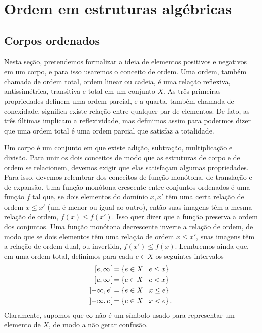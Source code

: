 \chapter{Ordem em estruturas algébricas}


\section{Corpos ordenados}

Nesta seção, pretendemos formalizar a ideia de elementos positivos e negativos em um corpo, e para isso usaremos o conceito de ordem. Uma ordem, também chamada de ordem total, ordem linear ou cadeia, é uma relação reflexiva, antissimétrica, transitiva e total em um conjunto $X$. As três primeiras propriedades definem uma ordem parcial, e a quarta, também chamada de conexidade, significa existe relação entre qualquer par de elementos. De fato, as três últimas implicam a reflexividade, mas definimos assim para podermos dizer que uma ordem total é uma ordem parcial que satisfaz a totalidade.

Um corpo é um conjunto em que existe adição, subtração, multiplicação e divisão. Para unir os dois conceitos de modo que as estruturas de corpo e de ordem se relacionem, devemos exigir que elas satisfaçam algumas propriedades. Para isso, devemos relembrar dos conceitos de função monótona, de translação e de expansão. Uma função monótona crescente entre conjuntos ordenados é uma função $f$ tal que, se dois elementos do domínio $x,x'$ têm uma certa relação de ordem $x \leq x'$  (um é menor ou igual ao outro), então suas imagens têm a mesma relação de ordem, $f(x) \leq f(x')$. Isso quer dizer que a função preserva a ordem dos conjuntos. Uma função monótona decrescente inverte a relação de ordem, de modo que se dois elementos têm uma relação de ordem $x \leq x'$, suas imagens têm a relação de ordem dual, ou invertida, $f(x') \leq f(x)$. Lembremos ainda que, em uma ordem total, definimos para cada $e \in X$ os seguintes intervalos
	\begin{align*}
	\left[{e},{\infty}\right[ &= \left\{{e \in X}\;\middle\vert\;{e \leq x}\right\} \\
	\left]{e},{\infty}\right[ &= \left\{{e \in X}\;\middle\vert\;{e < x}\right\} \\
	\left]{-\infty},{e}\right] &= \left\{{e \in X}\;\middle\vert\;{x \leq e}\right\} \\
	\left]{-\infty},{e}\right[ &= \left\{{e \in X}\;\middle\vert\;{x < e}\right\}.
	\end{align*}
Claramente, supomos que $\infty$ não é um símbolo usado para representar um elemento de $X$, de modo a não gerar confusão.


